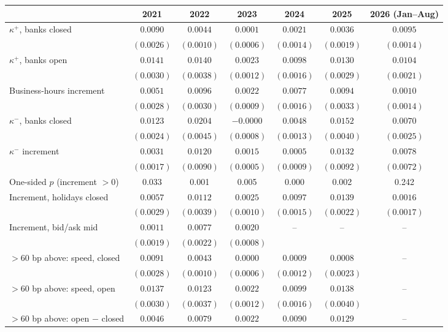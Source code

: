\begin{tabular}{lcccccc}
\toprule
 & 2021 & 2022 & 2023 & 2024 & 2025 & 2026 (Jan--Aug) \\
\midrule
$\kappa^+$, banks closed & $0.0090$ & $0.0044$ & $0.0001$ & $0.0021$ & $0.0036$ & $0.0095$ \\
 & $(0.0026)$ & $(0.0010)$ & $(0.0006)$ & $(0.0014)$ & $(0.0019)$ & $(0.0014)$ \\
$\kappa^+$, banks open & $0.0141$ & $0.0140$ & $0.0023$ & $0.0098$ & $0.0130$ & $0.0104$ \\
 & $(0.0030)$ & $(0.0038)$ & $(0.0012)$ & $(0.0016)$ & $(0.0029)$ & $(0.0021)$ \\
Business-hours increment & $0.0051$ & $0.0096$ & $0.0022$ & $0.0077$ & $0.0094$ & $0.0010$ \\
 & $(0.0028)$ & $(0.0030)$ & $(0.0009)$ & $(0.0016)$ & $(0.0033)$ & $(0.0014)$ \\
$\kappa^-$, banks closed & $0.0123$ & $0.0204$ & $-0.0000$ & $0.0048$ & $0.0152$ & $0.0070$ \\
 & $(0.0024)$ & $(0.0045)$ & $(0.0008)$ & $(0.0013)$ & $(0.0040)$ & $(0.0025)$ \\
$\kappa^-$ increment & $0.0031$ & $0.0120$ & $0.0015$ & $0.0005$ & $0.0132$ & $0.0078$ \\
 & $(0.0017)$ & $(0.0090)$ & $(0.0005)$ & $(0.0009)$ & $(0.0092)$ & $(0.0072)$ \\
One-sided $p$ (increment $>0$) & 0.033 & 0.001 & 0.005 & 0.000 & 0.002 & 0.242 \\
Increment, holidays closed & $0.0057$ & $0.0112$ & $0.0025$ & $0.0097$ & $0.0139$ & $0.0016$ \\
 & $(0.0029)$ & $(0.0039)$ & $(0.0010)$ & $(0.0015)$ & $(0.0022)$ & $(0.0017)$ \\
Increment, bid/ask mid & $0.0011$ & $0.0077$ & $0.0020$ & -- & -- & -- \\
 & $(0.0019)$ & $(0.0022)$ & $(0.0008)$ &  &  &  \\
\midrule
$>$60 bp above: speed, closed & $0.0091$ & $0.0043$ & $0.0000$ & $0.0009$ & $0.0008$ & -- \\
 & $(0.0028)$ & $(0.0010)$ & $(0.0006)$ & $(0.0012)$ & $(0.0023)$ &  \\
$>$60 bp above: speed, open & $0.0137$ & $0.0123$ & $0.0022$ & $0.0099$ & $0.0138$ & -- \\
 & $(0.0030)$ & $(0.0037)$ & $(0.0012)$ & $(0.0016)$ & $(0.0040)$ &  \\
$>$60 bp above: open $-$ closed & $0.0046$ & $0.0079$ & $0.0022$ & $0.0090$ & $0.0129$ & -- \\

\end{tabular}
